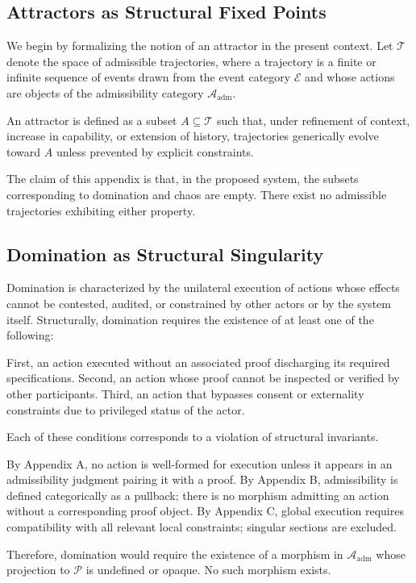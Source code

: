 \documentclass[11pt,oneside]{article}
\begin{document}
\subsection{Attractors as Structural Fixed Points}

We begin by formalizing the notion of an attractor in the present context. Let \( \mathcal{T} \) denote the space of admissible trajectories, where a trajectory is a finite or infinite sequence of events drawn from the event category \( \mathcal{E} \) and whose actions are objects of the admissibility category \( \mathcal{A}_{\mathrm{adm}} \).

An attractor is defined as a subset \( A \subseteq \mathcal{T} \) such that, under refinement of context, increase in capability, or extension of history, trajectories generically evolve toward \( A \) unless prevented by explicit constraints.

The claim of this appendix is that, in the proposed system, the subsets corresponding to domination and chaos are empty. There exist no admissible trajectories exhibiting either property.

\subsection{Domination as Structural Singularity}

Domination is characterized by the unilateral execution of actions whose effects cannot be contested, audited, or constrained by other actors or by the system itself. Structurally, domination requires the existence of at least one of the following:

First, an action executed without an associated proof discharging its required specifications.  
Second, an action whose proof cannot be inspected or verified by other participants.  
Third, an action that bypasses consent or externality constraints due to privileged status of the actor.

Each of these conditions corresponds to a violation of structural invariants.

By Appendix A, no action is well-formed for execution unless it appears in an admissibility judgment pairing it with a proof.  
By Appendix B, admissibility is defined categorically as a pullback; there is no morphism admitting an action without a corresponding proof object.  
By Appendix C, global execution requires compatibility with all relevant local constraints; singular sections are excluded.

Therefore, domination would require the existence of a morphism in \( \mathcal{A}_{\mathrm{adm}} \) whose projection to \( \mathcal{P} \) is undefined or opaque. No such morphism exists.
\end{document}
